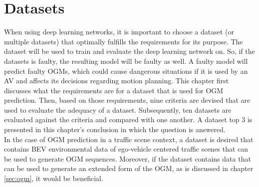 \section{Datasets} \label{sec:datasets}

When using deep learning networks, it is important to choose a dataset (or multiple datasets) that optimally fulfills the requirements for its purpose. The dataset will be used to train and evaluate the deep learning network on. So, if the datasets is faulty, the resulting model will be faulty as well. A faulty model will predict faulty \glspl{OGM}, which could cause dangerous situations if it is used by an \gls{AV} and affects its decisions regarding motion planning. This chapter first discusses what the requirements are for a dataset that is used for \gls{OGM} prediction. Then, based on those requirements, nine criteria are devised that are used to evaluate the adequacy of a dataset. Subsequently, ten datasets are evaluated against the criteria and compared with one another. A dataset top 3 is presented in this chapter's conclusion in which the question  is answered. \\

In the case of \gls{OGM} prediction in a traffic scene context, a dataset is desired that contains \gls{BEV} environmental data of ego-vehicle centered traffic scenes that can be used to generate \gls{OGM} sequences. Moreover, if the dataset contains data that can be used to generate an extended form of the \gls{OGM}, as is discussed in chapter \ref{sec:ogm}, it would be beneficial. \\

